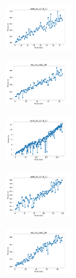 \begin{figure}[H]
\begin{subfigure}
    \end{subfigure}
    \hfill
    \begin{subfigure}
        \centering
        \includegraphics[width=0.32\textwidth]{img/bl/rand_set_const_20_589741062_time.png}
    \end{subfigure}
    \hfill
    \begin{subfigure}
        \centering
        \includegraphics[width=0.32\textwidth]{img/bl/iris_set_const_20_277451237_time.png}
    \end{subfigure}
    \hfill
    \begin{subfigure}
        \centering
        \includegraphics[width=0.32\textwidth]{img/bl/ecoli_set_const_20_277451237_time.png}
    \end{subfigure}
    \hfill
    \begin{subfigure}
        \centering
        \includegraphics[width=0.32\textwidth]{img/bl/rand_set_const_20_277451237_time.png}
    \end{subfigure}
    \hfill
    \begin{subfigure}
        \centering
        \includegraphics[width=0.32\textwidth]{img/bl/iris_set_const_20_49258669_time.png}

\end{subfigure}
\end{figure}
